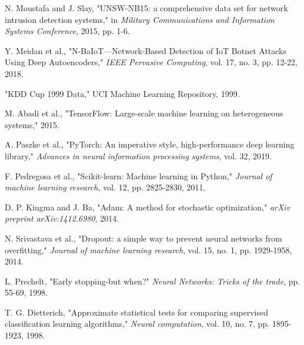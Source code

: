 \documentclass[conference]{IEEEtran}
\begin{document}
\begin{thebibliography}{00}
 N. Moustafa and J. Slay, "UNSW-NB15: a comprehensive data set for network intrusion detection systems," in \textit{Military Communications and Information Systems Conference}, 2015, pp. 1-6.

 Y. Meidan et al., "N-BaIoT—Network-Based Detection of IoT Botnet Attacks Using Deep Autoencoders," \textit{IEEE Pervasive Computing}, vol. 17, no. 3, pp. 12-22, 2018.

 "KDD Cup 1999 Data," UCI Machine Learning Repository, 1999.

 M. Abadi et al., "TensorFlow: Large-scale machine learning on heterogeneous systems," 2015.

 A. Paszke et al., "PyTorch: An imperative style, high-performance deep learning library," \textit{Advances in neural information processing systems}, vol. 32, 2019.

 F. Pedregosa et al., "Scikit-learn: Machine learning in Python," \textit{Journal of machine learning research}, vol. 12, pp. 2825-2830, 2011.

 D. P. Kingma and J. Ba, "Adam: A method for stochastic optimization," \textit{arXiv preprint arXiv:1412.6980}, 2014.

 N. Srivastava et al., "Dropout: a simple way to prevent neural networks from overfitting," \textit{Journal of machine learning research}, vol. 15, no. 1, pp. 1929-1958, 2014.

 L. Prechelt, "Early stopping-but when?" \textit{Neural Networks: Tricks of the trade}, pp. 55-69, 1998.

 T. G. Dietterich, "Approximate statistical tests for comparing supervised classification learning algorithms," \textit{Neural computation}, vol. 10, no. 7, pp. 1895-1923, 1998.

\end{thebibliography}
\end{document}
